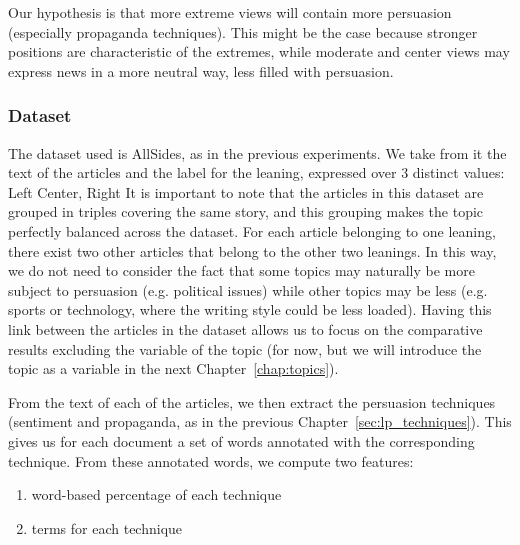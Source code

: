 

Our hypothesis is that more extreme views will contain more persuasion (especially propaganda techniques). This might be the case because stronger positions are characteristic of the extremes, while moderate and center views may express news in a more neutral way, less filled with persuasion.

\subsubsection{Dataset}
The dataset used is AllSides, as in the previous experiments.
We take from it the text of the articles and the label for the leaning, expressed over 3 distinct values: Left Center, Right
It is important to note that the articles in this dataset are grouped in triples covering the same story, and this grouping makes the topic perfectly balanced across the dataset. For each article belonging to one leaning, there exist two other articles that belong to the other two leanings.
In this way, we do not need to consider the fact that some topics may naturally be more subject to persuasion (e.g. political issues) while other topics may be less (e.g. sports or technology, where the writing style could be less loaded).
Having this link between the articles in the dataset allows us to focus on the comparative results excluding the variable of the topic (for now, but we will introduce the topic as a variable in the next Chapter~\ref{chap:topics}).

From the text of each of the articles, we then extract the persuasion techniques (sentiment and propaganda, as in the previous Chapter~\ref{sec:lp_techniques}). This gives us for each document a set of words annotated with the corresponding technique. From these annotated words, we compute two features:
\begin{enumerate}
    \item word-based percentage of each technique
    \item terms for each technique
\end{enumerate}



